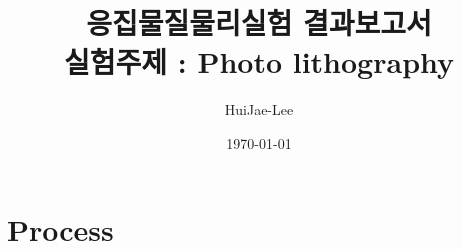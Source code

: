 \documentclass[aps,reprint,superscriptaddress,10pt]{revtex4-2}
\begin{document}
\title{응집물질물리실험 결과보고서 \\
\small 실험주제 : Photo lithography}

\author{HuiJae-Lee}

\date{\today}


\begin{abstract}

 \end{abstract}
 
 \maketitle
 
\section{Process}
\end{document}
